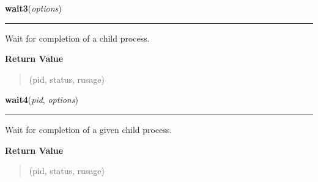 \hspace{.8\funcindent}\begin{boxedminipage}{\funcwidth}

    \raggedright \textbf{wait3}(\textit{options})

    \vspace{-1.5ex}

    \rule{\textwidth}{0.5\fboxrule}
\setlength{\parskip}{2ex}
    Wait for completion of a child process.

\setlength{\parskip}{1ex}
      \textbf{Return Value}
    \vspace{-1ex}

      \begin{quote}
      (pid, status, rusage)

      \end{quote}

    \end{boxedminipage}

    \label{os:wait4}

    \vspace{0.5ex}

\hspace{.8\funcindent}\begin{boxedminipage}{\funcwidth}

    \raggedright \textbf{wait4}(\textit{pid}, \textit{options})

    \vspace{-1.5ex}

    \rule{\textwidth}{0.5\fboxrule}
\setlength{\parskip}{2ex}
    Wait for completion of a given child process.

\setlength{\parskip}{1ex}
      \textbf{Return Value}
    \vspace{-1ex}

      \begin{quote}
      (pid, status, rusage)

      \end{quote}

    \end{boxedminipage}

    \label{os:waitpid}

    \vspace{0.5ex}

